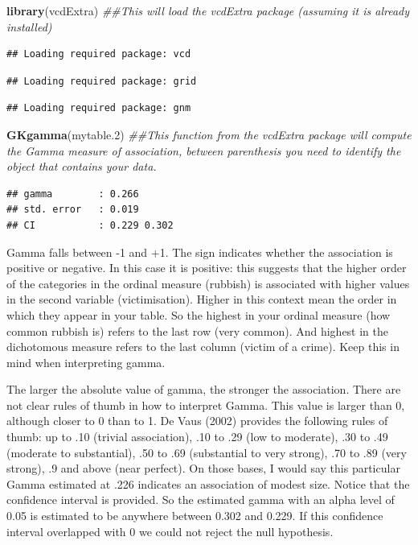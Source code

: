 \documentclass[]{book}
\newenvironment{Shaded}{\begin{snugshade}}{\end{snugshade}}
\newcommand{\CommentTok}[1]{\textcolor[rgb]{0.56,0.35,0.01}{\textit{#1}}}
\newcommand{\FloatTok}[1]{\textcolor[rgb]{0.00,0.00,0.81}{#1}}
\newcommand{\KeywordTok}[1]{\textcolor[rgb]{0.13,0.29,0.53}{\textbf{#1}}}
\newcommand{\NormalTok}[1]{#1}
\theoremstyle{definition}
\theoremstyle{definition}
\theoremstyle{definition}
\theoremstyle{remark}
\begin{document}
\begin{Shaded}
\begin{Highlighting}[]
\KeywordTok{library}\NormalTok{(vcdExtra) }\CommentTok{##This will load the vcdExtra package (assuming it is already installed)}
\end{Highlighting}
\end{Shaded}

\begin{verbatim}
## Loading required package: vcd
\end{verbatim}

\begin{verbatim}
## Loading required package: grid
\end{verbatim}

\begin{verbatim}
## Loading required package: gnm
\end{verbatim}

\begin{Shaded}
\begin{Highlighting}[]
\KeywordTok{GKgamma}\NormalTok{(mytable}\FloatTok{.2}\NormalTok{) }\CommentTok{##This function from the vcdExtra package will compute the Gamma measure of association, between parenthesis you need to identify the object that contains your data.}
\end{Highlighting}
\end{Shaded}

\begin{verbatim}
## gamma        : 0.266 
## std. error   : 0.019 
## CI           : 0.229 0.302
\end{verbatim}

Gamma falls between -1 and +1. The sign indicates whether the
association is positive or negative. In this case it is positive: this
suggests that the higher order of the categories in the ordinal measure
(rubbish) is associated with higher values in the second variable
(victimisation). Higher in this context mean the order in which they
appear in your table. So the highest in your ordinal measure (how common
rubbish is) refers to the last row (very common). And highest in the
dichotomous measure refers to the last column (victim of a crime). Keep
this in mind when interpreting gamma.

The larger the absolute value of gamma, the stronger the association.
There are not clear rules of thumb in how to interpret Gamma. This value
is larger than 0, although closer to 0 than to 1. De Vaus (2002)
provides the following rules of thumb: up to .10 (trivial association),
.10 to .29 (low to moderate), .30 to .49 (moderate to substantial), .50
to .69 (substantial to very strong), .70 to .89 (very strong), .9 and
above (near perfect). On those bases, I would say this particular Gamma
estimated at .226 indicates an association of modest size. Notice that
the confidence interval is provided. So the estimated gamma with an
alpha level of 0.05 is estimated to be anywhere between 0.302 and 0.229.
If this confidence interval overlapped with 0 we could not reject the
null hypothesis.
\end{document}
